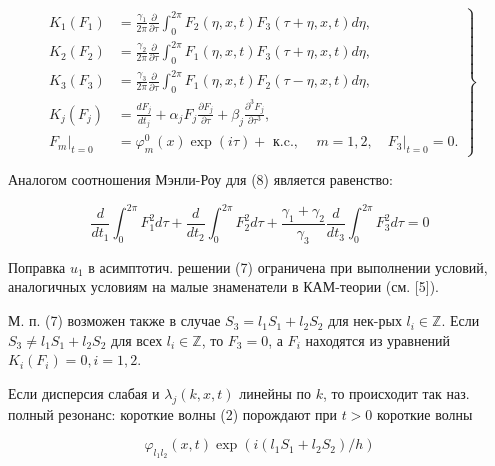 \documentclass[10pt]{article}
\begin{document}
\[

\left.\begin{array}{rl}

K_{1}\left(F_{1}\right) & =\frac{\gamma_{1}}{2 \pi} \frac{\partial}{\partial \tau} \int_{0}^{2 \pi} F_{2}(\eta, x, t) F_{3}(\tau+\eta, x, t) d \eta, \\

K_{2}\left(F_{2}\right) & =\frac{\gamma_{2}}{2 \pi} \frac{\partial}{\partial \tau} \int_{0}^{2 \pi} F_{1}(\eta, x, t) F_{3}(\tau+\eta, x, t) d \eta, \\

K_{3}\left(F_{3}\right) & =\frac{\gamma_{3}}{2 \pi} \frac{\partial}{\partial \tau} \int_{0}^{2 \pi} F_{1}(\eta, x, t) F_{2}(\tau-\eta, x, t) d \eta, \\

K_{j}\left(F_{j}\right) & =\frac{d F_{j}}{d t_{j}}+\alpha_{j} F_{j} \frac{\partial F_{j}}{\partial \tau}+\beta_{j} \frac{\partial^{3} F_{j}}{\partial \tau^{3}}, \\

\left.F_{m}\right|_{t=0} & =\varphi_{m}^{0}(x) \exp (i \tau)+\text { к.c., } \quad m=1,2,\left.\quad F_{3}\right|_{t=0}=0 .

\end{array}\right\}

\]



Аналогом соотношения Мэнли-Роу для (8) является равенство:



\[

\frac{d}{d t_{1}} \int_{0}^{2 \pi} F_{1}^{2} d \tau+\frac{d}{d t_{2}} \int_{0}^{2 \pi} F_{2}^{2} d \tau+\frac{\gamma_{1}+\gamma_{2}}{\gamma_{3}} \frac{d}{d t_{3}} \int_{0}^{2 \pi} F_{3}^{2} d \tau=0

\]



Поправка $u_{1}$ в асимптотич. решении (7) ограничена при выполнении условий, аналогичных условиям на малые знаменатели в КАМ-теории (см. [5]).



М. п. (7) возможен также в случае $S_{3}=l_{1} S_{1}+l_{2} S_{2}$ для нек-рых $l_{i} \in \mathbb{Z}$. Если $S_{3} \neq l_{1} S_{1}+l_{2} S_{2}$ для всех $l_{i} \in \mathbb{Z}$, то $F_{3}=0$, а $F_{i}$ находятся из уравнений $K_{i}\left(F_{i}\right)=0, i=1,2$.



Если дисперсия слабая и $\lambda_{j}(k, x, t)$ линейны по $k$, то происходит так наз. полный резонанс: короткие волны (2) порождают при $t>0$ короткие волны



\[

\varphi_{l_{1} l_{2}}(x, t) \exp \left(i\left(l_{1} S_{1}+l_{2} S_{2}\right) / h\right)

\]
\end{document}
